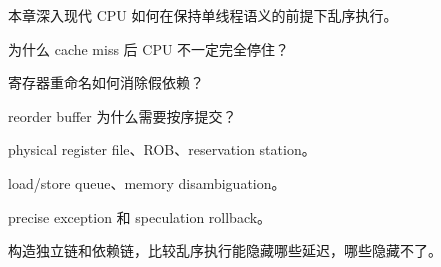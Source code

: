 {本章深入现代 CPU 如何在保持单线程语义的前提下乱序执行。}
{\item 为什么 cache miss 后 CPU 不一定完全停住？
\item 寄存器重命名如何消除假依赖？
\item reorder buffer 为什么需要按序提交？}
{\item physical register file、ROB、reservation station。
\item load/store queue、memory disambiguation。
\item precise exception 和 speculation rollback。}
{构造独立链和依赖链，比较乱序执行能隐藏哪些延迟，哪些隐藏不了。}

